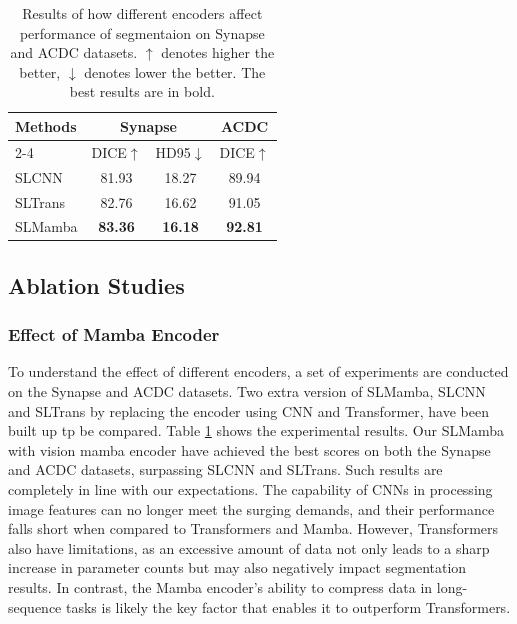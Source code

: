 \documentclass[10pt, a4paper, twocolumn]{article}
\begin{document}
\begin{table}[h]
\small
\centering
\begin{tabular}{l|cc|c}\hline
\multirow{2}{*}{Methods} & \multicolumn{2}{c|}{Synapse} & ACDC \\\cline{2-4}
& DICE$\uparrow$ & HD95$\downarrow$ & DICE$\uparrow$ \\\hline
SLCNN & 81.93 &18.27& 89.94\\
SLTrans & 82.76 & 16.62 & 91.05\\\hline
SLMamba & \textbf{83.36} & \textbf{16.18} & \textbf{92.81} \\\hline
\end{tabular}
\caption{Results of how different encoders affect performance of segmentaion on Synapse and ACDC datasets. $\uparrow$ denotes higher the better, $\downarrow$ denotes lower the better. The best results are in bold.}
\label{table3}
\end{table}

\subsection{Ablation Studies}


\subsubsection{Effect of Mamba Encoder}

To understand the effect of different encoders, a set of experiments are conducted on the Synapse and ACDC datasets. Two extra version of SLMamba, SLCNN and SLTrans by replacing the encoder using CNN and Transformer, have been built up tp be compared. Table \textcolor{red}{\ref{table3}} shows the experimental results. Our SLMamba with vision mamba encoder have achieved the best scores on both the Synapse and ACDC datasets, surpassing SLCNN and SLTrans. Such results are completely in line with our expectations. The capability of CNNs in processing image features can no longer meet the surging demands, and their performance falls short when compared to Transformers and Mamba. However, Transformers also have limitations, as an excessive amount of data not only leads to a sharp increase in parameter counts but may also negatively impact segmentation results. In contrast, the Mamba encoder's ability to compress data in long-sequence\cite{yu2024mambaout} tasks is likely the key factor that enables it to outperform Transformers.
\end{document}
